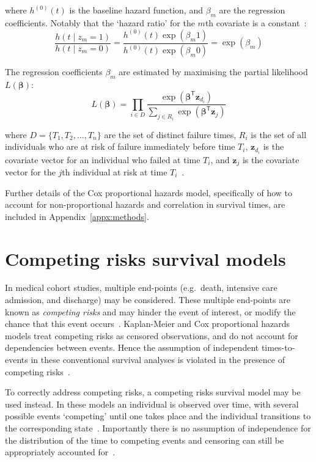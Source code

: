 where $h^{(0)}(t)$ is the baseline hazard function, and $\beta_{m}$ are the regression coefficients. Notably that the `hazard ratio' for the $m$th covariate is a constant~\parencite{Klein2005-ls}:
%
\[
    \frac{h(t \mid z_m = 1)}{h(t \mid z_m = 0)} = \frac{h^{(0)}(t)\exp(\beta_m 1)}{h^{(0)}(t)\exp(\beta_m 0)} = \exp(\beta_{m})
\]

The regression coefficients $\beta_{m}$ are estimated by maximising the partial likelihood $L(\bm{\beta})$:
%
\[
    L(\bm{\beta}) = \prod_{i \in D}\frac{\exp(\bm{\beta}^\mathsf{T}\bm{z}_{d_i})}{\sum_{j \in R_i}\exp(\bm{\beta}^\mathsf{T}\bm{z}_j)}
\]

where $D = \{T_1, T_2, \ldots, T_n\}$ are the set of distinct failure times, $R_i$ is the set of all individuals who are at risk of failure immediately before time $T_i$, $\bm{z}_{d_i}$ is the covariate vector for an individual who failed at time $T_i$, and $\bm{z}_j$ is the covariate vector for the $j$th individual at risk at time $T_i$~\parencite{Klein2005-ls}.

Further details of the Cox proportional hazards model, specifically of how to account for non-proportional hazards and correlation in survival times, are included in Appendix~\ref{appx:methods}.

\section{Competing risks survival models}\label{sec:cr-models}

In medical cohort studies, multiple end-points (e.g.\ death, intensive care admission, and discharge) may be considered. These multiple end-points are known as \textit{competing risks} and may hinder the event of interest, or modify the chance that this event occurs~\parencite{Collett2023-bg}. Kaplan-Meier and Cox proportional hazards models treat competing risks as censored observations, and do not account for dependencies between events. Hence the assumption of independent times-to-events in these conventional survival analyses is violated in the presence of competing risks~\parencite{Andersen2012-gp, Putter2007-kb}.

To correctly address competing risks, a competing risks survival model may be used instead. In these models an individual is observed over time, with several possible events `competing' until one takes place and the individual transitions to the corresponding state~\parencite{Lipsitch2015-kg}. Importantly there is no assumption of independence for the distribution of the time to competing events and censoring can still be appropriately accounted for~\parencite{Prentice1978-ja, Putter2007-kb}.

